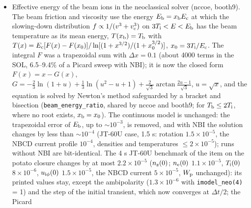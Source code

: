 \documentclass[11pt]{article}
\def\r#1{{\rm#1}}
\begin{document}
\begin{itemize}
  JT-60U benchmark (3.2 MW, \texttt{FSRP} = 0, \texttt{NRMAX} = 60, 4 s), 0 against 1: line average 1.142 / 1.142
  $\times10^{19}$ m$^{-3}$, $n_\r{e}(0)$ 1.724 / 1.728, $n_\r{i}(0)$ 1.218 / 1.228, $n_\r{z}(0)$ 1.93 / 1.85 $\times10^{17}$ m$^{-3}$,
  $n_\r{b}/n_\r{i}(0)$ 0.32 / 0.32, $n_\r{e}$ at $\rho$ = 0.8, 0.95, 1.0 unchanged (0.68, 0.45, 0.33), $u_{\r{i}\phi}(0)$
  439 / 438 km/s, $T_\r{i}(0)$ 7.85 / 7.88 keV, $T_\r{e}(0)$ 4.32 / 4.32 keV, bootstrap current 0.125 / 0.124 MA,
  $W_\r{p}$ 1.088 MJ, ambipolarity $1.2\times10^{-6}$ in both; retried steps 2 / 246 (the window at 1.310--1.335 s),
  one step of the initial transient not converged at $\Delta t/2$ in both.  With \texttt{imodel\_neo(4)} = 0 the
  benchmark of the item on the production defaults above is reproduced bit for bit (all sweeps of the 40000 steps).
\item Effective energy of the beam ions in the neoclassical solver (nccoe, booth9).  The beam friction and viscosity use
  the energy $E_\r{b} = x_\r{b}E_\r{c}$ at which the slowing-down distribution $f\propto1/(v^3+v_\r{c}^3)$ on
  $3T_\r{i}<E<E_\r{b}$ has the beam temperature as its mean energy, $T(x_\r{b}) = T_\r{b}$ with
  $T(x) = E_\r{c}[F(x)-F(x_0)]/\ln[(1+x^{3/2})/(1+x_0^{3/2})]$, $x_0 = 3T_\r{i}/E_\r{c}$.  The integral
  $F$ was a trapezoidal sum with $\Delta x = 0.1$ (about 4000 terms in the SOL, 6.5--9.4\% of a Picard sweep
  with NBI); it is now the closed form $F(x) = x - G(x)$,
  $G = -\frac23\ln(1+u)+\frac13\ln(u^2-u+1)+\frac{2}{\sqrt3}\arctan\frac{2u-1}{\sqrt3}$, $u = \sqrt x$, and the
  equation is solved by Newton's method safeguarded by a bracket and bisection (\texttt{beam\_energy\_ratio},
  shared by nccoe and booth9; for $T_\r{b}\le2T_\r{i}$, where no root exists, $x_\r{b} = x_0$).  The continuous
  model is unchanged: the trapezoidal error of $E_\r{b}$, up to $\sim10^{-3}$, is removed, and with NBI the
  solution changes by less than $\sim10^{-4}$ (JT-60U case, 1.5 s: rotation $1.5\times10^{-5}$, the NBCD
  current profile $10^{-4}$, densities and temperatures $\le2\times10^{-5}$); runs without NBI are
  bit-identical.  The 4 s JT-60U benchmark of the item on the potato closure changes by at most $2.2\times10^{-5}$
  ($n_\r{z}(0)$; $n_\r{e}(0)$ $1.1\times10^{-5}$, $T_\r{i}(0)$ $8\times10^{-6}$, $u_{\r{i}\phi}(0)$ $1.5\times10^{-5}$, the NBCD current
  $5\times10^{-5}$, $W_\r{p}$ unchanged): its printed values stay, except the ambipolarity ($1.3\times10^{-6}$ with
  \texttt{imodel\_neo(4)} = 1) and the step of the initial transient, which now converges at $\Delta t/2$; the Picard

\end{itemize}
\end{document}
